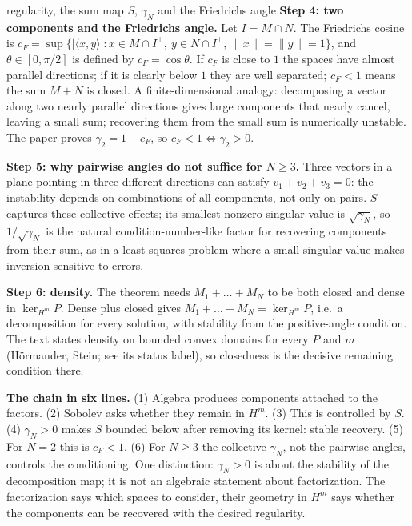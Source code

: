 \begin{explained}{regularity, the sum map $S$, $\gamma_N$ and the Friedrichs angle}
\medskip\textbf{Step 4: two components and the Friedrichs angle.} Let $I=M\cap N$. The Friedrichs cosine is $c_F=\sup\{|\langle x,y\rangle|:x\in M\cap I^\perp,\ y\in N\cap I^\perp,\ \|x\|=\|y\|=1\}$, and $\theta\in[0,\pi/2]$ is defined by $c_F=\cos\theta$. If $c_F$ is close to $1$ the spaces have almost parallel directions; if it is clearly below $1$ they are well separated; $c_F<1$ means the sum $M+N$ is closed. A finite-dimensional analogy: decomposing a vector along two nearly parallel directions gives large components that nearly cancel, leaving a small sum; recovering them from the small sum is numerically unstable. The paper proves $\gamma_2=1-c_F$, so $c_F<1\iff\gamma_2>0$.

\medskip\textbf{Step 5: why pairwise angles do not suffice for $N\ge3$.} Three vectors in a plane pointing in three different directions can satisfy $v_1+v_2+v_3=0$: the instability depends on combinations of all components, not only on pairs. $S$ captures these collective effects; its smallest nonzero singular value is $\sqrt{\gamma_N}$, so $1/\sqrt{\gamma_N}$ is the natural condition-number-like factor for recovering components from their sum, as in a least-squares problem where a small singular value makes inversion sensitive to errors.

\medskip\textbf{Step 6: density.} The theorem needs $M_1+\dots+M_N$ to be both closed and dense in $\ker_{H^m}P$. Dense plus closed gives $M_1+\dots+M_N=\ker_{H^m}P$, i.e.\ a decomposition for every solution, with stability from the positive-angle condition. The text states density on bounded convex domains for every $P$ and $m$ (H\"ormander, Stein; see its status label), so closedness is the decisive remaining condition there.

\medskip\textbf{The chain in six lines.} (1) Algebra produces components attached to the factors. (2) Sobolev asks whether they remain in $H^m$. (3) This is controlled by $S$. (4) $\gamma_N>0$ makes $S$ bounded below after removing its kernel: stable recovery. (5) For $N=2$ this is $c_F<1$. (6) For $N\ge3$ the collective $\gamma_N$, not the pairwise angles, controls the conditioning. One distinction: $\gamma_N>0$ is about the stability of the decomposition map; it is not an algebraic statement about factorization. The factorization says which spaces to consider, their geometry in $H^m$ says whether the components can be recovered with the desired regularity.
\end{explained}
